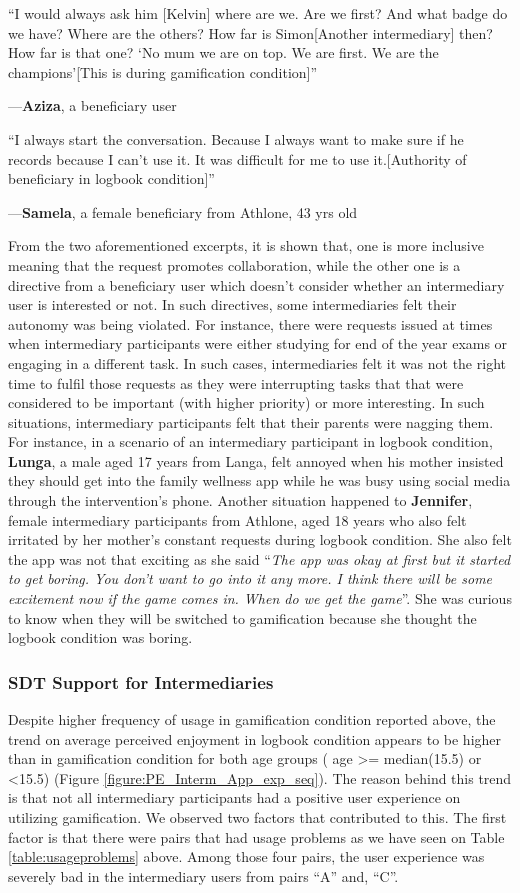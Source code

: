 \documentclass{sig-alternate}
\newenvironment{myquote}
               {\list{}{\rightmargin   \leftmargin
                        \parsep        0in }%
                \item\relax}
               {\endlist}
\newcommand{\userquote}[2]{\begin{samepage}\begin{myquote} 
     \em{\small{#2\begin{flushright}---#1\end{flushright}}}
   \end{myquote}\end{samepage}}
\begin{document}
\userquote{\textbf{Aziza}, a beneficiary user}{``I would always ask him [Kelvin] where are we. Are we first? And what badge do we have? Where are the others? How far is Simon[Another intermediary] then? How far is that one? `No mum we are on top. We are first. We are the champions'[This is during gamification condition]''} 

\userquote{\textbf{Samela}, a female beneficiary from Athlone, 43 yrs old} {``I always start the conversation. Because I always want to make sure if he records because I can't use it. It was difficult for me to use it.[Authority of beneficiary in logbook condition]''}

From the two aforementioned excerpts, it is shown that, one is more inclusive meaning that the request promotes collaboration, while the other one is a directive from a beneficiary user which doesn't consider whether an intermediary user is interested or not. In such directives, some intermediaries felt their autonomy was being violated. For instance, there were requests issued at times when intermediary participants were either studying for end of the year exams or engaging in a different task. In such cases, intermediaries felt it was not the right time to fulfil those requests as they were interrupting tasks that that were considered to be important (with higher priority) or more interesting. In such situations, intermediary participants felt that their parents were nagging them. For instance, in a scenario of an intermediary participant in logbook condition, \textbf{Lunga}, a male aged 17 years from Langa, felt annoyed when his mother insisted they should get into the family wellness app while he was busy using social media through the intervention's phone. Another situation happened to \textbf{Jennifer}, female intermediary participants from Athlone, aged 18 years who also felt irritated by her mother's constant requests during logbook condition. She also felt the app was not that exciting as she said ``\emph{The app was okay at first but it started to get boring. You don't want to go into it any more. I think there will be some excitement now if the game comes in. When do we get the game}''. She was curious to know when they will be switched to gamification because she thought the logbook condition was boring.
\subsubsection{{SDT Support for Intermediaries}}  
Despite higher frequency of usage in gamification condition reported above, the trend on average perceived enjoyment in logbook condition appears to be higher than in gamification condition for both age groups ( age \textgreater = median(15.5) or \textless 15.5) (Figure \ref{figure:PE_Interm_App_exp_seq}). The reason behind this trend is that not all intermediary participants had a positive user experience on utilizing gamification. We observed two factors that contributed  to this. The first factor is that there were pairs that had usage problems as we have seen on Table \ref{table:usageproblems} above. Among those four pairs, the user experience was severely bad in the intermediary users from pairs ``A'' and, ``C''.
\end{document}
